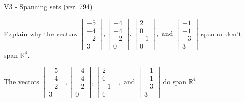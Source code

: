 \begin{exercise}
  \begin{exerciseTitle}V3 - Spanning sets (ver. 794)\end{exerciseTitle}
  \begin{exerciseStatement}
    Explain why the vectors \(\left[\begin{array}{r}
-5 \\
-4 \\
-2 \\
3
\end{array}\right] , \left[\begin{array}{r}
-4 \\
-4 \\
-2 \\
0
\end{array}\right] , \left[\begin{array}{r}
2 \\
0 \\
-1 \\
0
\end{array}\right] , \text{ and } \left[\begin{array}{r}
-1 \\
-1 \\
-3 \\
3
\end{array}\right]\) span or don't span \(\mathbb{R}^4\). 
	


  \end{exerciseStatement}
  \begin{exerciseAnswer}
   The vectors \(\left[\begin{array}{r}
-5 \\
-4 \\
-2 \\
3
\end{array}\right] , \left[\begin{array}{r}
-4 \\
-4 \\
-2 \\
0
\end{array}\right] , \left[\begin{array}{r}
2 \\
0 \\
-1 \\
0
\end{array}\right] , \text{ and } \left[\begin{array}{r}
-1 \\
-1 \\
-3 \\
3
\end{array}\right]\) 
  	 do  
	span \(\mathbb{R}^4\).
  


  \end{exerciseAnswer}
\end{exercise}